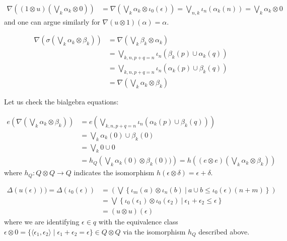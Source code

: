 \begin{itemize}
\begin{align*}
\nabla\left(
(1\otimes u)\left(\bigvee_{k}\alpha_{k}\otimes 0\right)\right) & =
\nabla\left( \bigvee_{k}\alpha_{k}\otimes\iota_{0}(\epsilon)\right)
=
\bigvee_{n,k}\iota_{n}( \alpha_{k}(n) )
 =  \bigvee_{k}\alpha_{k} \otimes 0
\end{align*}
and one can argue similarly for $\nabla(u\otimes 1)(\alpha)=\alpha$.

\begin{align*}
\nabla\left (\sigma\left (\bigvee_{k}\alpha_{k}\otimes \beta_{k}
\right) \right) & = 
\nabla \left (
\bigvee_{k}\beta_{k}\otimes \alpha_{k}
\right)\\
&= 
\bigvee_{k,n, p+q=n} \iota_{n}(\beta_{k}(p)\cup \alpha_{k}(q))
\\
&= 
\bigvee_{k,n, p+q=n}\iota_{n}( \alpha_{k}(p)\cup \beta_{k}(q))
\\
&= \nabla\left (\bigvee_{k}\alpha_{k}\otimes \beta_{k}\right)
\end{align*}


Let us check the bialgebra equations:


\begin{align*}
e\left (\nabla\left (\bigvee_{k}\alpha_{k}\otimes \beta_{k}\right)\right)  & =
e\left(
\bigvee_{k,n, p+q=n}\iota_{n}(\alpha_{k}(p)\cup \beta_{k}(q))
\right)
\\
&= \bigvee_{k}\alpha_{k}(0)\cup\beta_{k}(0) \\
&= \bigvee_{k} 0\cup 0\\
&= h_{Q}\left(\bigvee_{k}\alpha_{k}(0)\otimes\beta_{k}(0))\right) = h\left( (e\otimes e)\left(\bigvee_{k}\alpha_{k}\otimes \beta_{k}\right)\right)
\end{align*}
where $h_{Q}:Q\otimes Q \to Q$ indicates the isomorphism $h(\epsilon\otimes \delta)=\epsilon+\delta$.


\begin{align*}
\Delta(u(\epsilon))) = \Delta(\iota_{0}(\epsilon)) &=
 \left(
\bigvee\left\{\iota_{m}(a)\otimes\iota_{n}(b) \ \Bigg \vert \ 
a\cup b \leq \iota_{0}(\epsilon)(n+m)\right\}\right)\\
&=\bigvee\left\{\iota_{0}(\epsilon_{1})\otimes\iota_{0}(\epsilon_{2}) \ \Bigg \vert \ 
\epsilon_{1}+\epsilon_{2} \leq \epsilon\right\}\\
&= (u\otimes u)(\epsilon)
\end{align*}
where we are identifying $\epsilon \in q$ with the equivalence class
$\epsilon \otimes 0 = \{ \langle \epsilon_{1},\epsilon_{2}\rangle\mid \epsilon_{1}+\epsilon_{2}=\epsilon\}\in 
Q\otimes Q$ via the isomorphism $h_{Q}$ described above.


\end{itemize}
